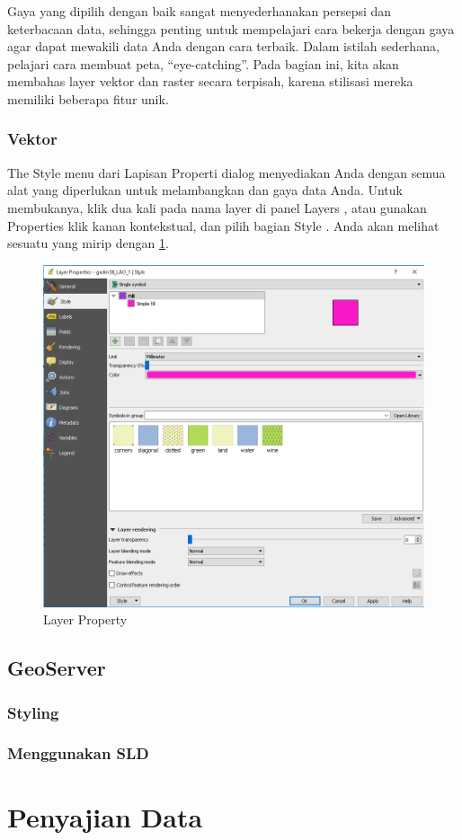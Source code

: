 \documentclass[]{book}
\begin{document}
Gaya yang dipilih dengan baik sangat menyederhanakan persepsi dan keterbacaan data, sehingga penting untuk mempelajari cara bekerja dengan gaya agar dapat mewakili data Anda dengan cara terbaik. Dalam istilah sederhana, pelajari cara membuat peta, ``eye-catching''. Pada bagian ini, kita akan membahas layer vektor dan raster secara terpisah, karena stilisasi mereka memiliki beberapa fitur unik.

\hypertarget{vektor}{%
\subsection{Vektor}\label{vektor}}

The Style menu dari Lapisan Properti dialog menyediakan Anda dengan semua alat yang diperlukan untuk melambangkan dan gaya data Anda. Untuk membukanya, klik dua kali pada nama layer di panel Layers , atau gunakan Properties klik kanan kontekstual, dan pilih bagian Style . Anda akan melihat sesuatu yang mirip dengan \ref{fig:fig92}.

\begin{figure}

{\centering \includegraphics[width=0.3\linewidth]{images/09/fig92} 

}

\caption{Layer Property}\label{fig:fig92}
\end{figure}

\hypertarget{geoserver-2}{%
\section{GeoServer}\label{geoserver-2}}

\hypertarget{styling-1}{%
\subsection{Styling}\label{styling-1}}

\hypertarget{menggunakan-sld}{%
\subsection{Menggunakan SLD}\label{menggunakan-sld}}

\hypertarget{penyajian-data}{%
\chapter{Penyajian Data}\label{penyajian-data}}


\end{document}
